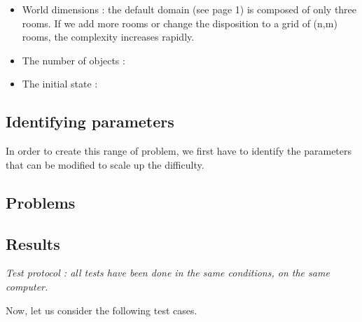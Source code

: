 \begin{itemize}
  \item World dimensions : the default domain (see page 1) is composed of only
three rooms. If we add more rooms or change the disposition to a grid of (n,m) rooms, the complexity increases rapidly.
  \item The number of objects :
  \item The initial state :
\end{itemize}

\subsection*{Identifying parameters}
In order to create this range of problem, we first have to identify the
parameters that can be modified to scale up the difficulty.

\subsection*{Problems}



\subsection*{Results}

\textit{Test protocol : all tests have been done in the same conditions, on
the same computer.}

Now, let us consider the following test cases.
